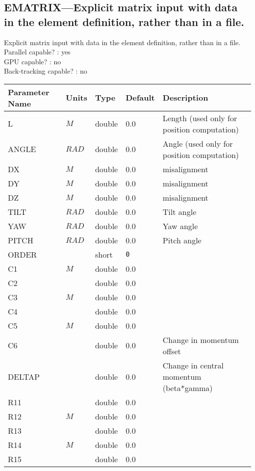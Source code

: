 \subsection{EMATRIX---Explicit matrix input with data in the element definition, rather than in a file.}
Explicit matrix input with data in the element definition, rather than in a file.
\\
Parallel capable? : yes\\
GPU capable? : no\\
Back-tracking capable? : no\\
\begin{tabular}{|l|l|l|l|p{\descwidth}|} \hline
Parameter Name & Units & Type & Default & Description \\ \hline 
L & $M$ & double &  0.0 & Length (used only for position computation)  \\ \hline 
ANGLE & $RAD$ & double &  0.0 & Angle (used only for position computation)  \\ \hline 
DX & $M$ & double &  0.0 & misalignment  \\ \hline 
DY & $M$ & double &  0.0 & misalignment  \\ \hline 
DZ & $M$ & double &  0.0 & misalignment  \\ \hline 
TILT & $RAD$ & double &  0.0 & Tilt angle  \\ \hline 
YAW & $RAD$ & double &  0.0 & Yaw angle  \\ \hline 
PITCH & $RAD$ & double &  0.0 & Pitch angle  \\ \hline 
ORDER &  & short &  \verb|0| & \\ \hline 
C1 & $M$ & double &  0.0 & \\ \hline 
C2 &  & double &  0.0 & \\ \hline 
C3 & $M$ & double &  0.0 & \\ \hline 
C4 &  & double &  0.0 & \\ \hline 
C5 & $M$ & double &  0.0 & \\ \hline 
C6 &  & double &  0.0 & Change in momentum offset  \\ \hline 
DELTAP &  & double &  0.0 & Change in central momentum (beta*gamma)  \\ \hline 
R11 &  & double &  0.0 & \\ \hline 
R12 & $M$ & double &  0.0 & \\ \hline 
R13 &  & double &  0.0 & \\ \hline 
R14 & $M$ & double &  0.0 & \\ \hline 
R15 &  & double &  0.0 & \\ \hline 

\end{tabular}
